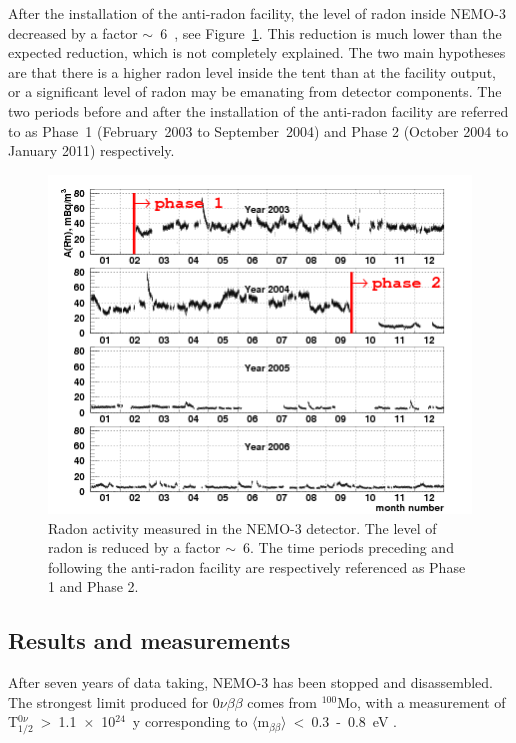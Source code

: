 \documentclass[main.tex]{subfiles}
\begin{document}
\NI After the installation of the anti-radon facility, the level of radon inside NEMO-3 decreased by a factor $\sim$~6~\cite{NEMO3-BKG}, see Figure~\ref{RadonByTime}. This reduction is much lower than the expected reduction, which is not completely explained. The two main hypotheses are that there is a higher radon level inside the tent than at the facility output, or a significant level of radon may be emanating from detector components. The two periods before and after the installation of the anti-radon facility are referred to as Phase~1 (February~2003 to September~2004) and Phase 2 (October 2004 to January 2011) respectively.

 
\begin{figure}[h!]
\begin{center}
\includegraphics[scale=0.75]{pictures/Chap3/rn_bytime.png}
\caption{Radon activity measured in the NEMO-3 detector. The level of radon is reduced by a factor $\sim$~6. The time periods preceding and following the anti-radon facility are respectively referenced as Phase 1 and Phase 2.}
\label{RadonByTime}
\end{center}
\end{figure}


\FloatBarrier


\FloatBarrier

\subsection{Results and measurements}


\NI After seven years of data taking, NEMO-3 has been stopped and disassembled. The strongest limit produced for 0$\nu\beta\beta$ comes from $^{\text{100}}$Mo, with a measurement of T$_{\text{1/2}}^{\text{0}\nu}$~>~1.1~$\times$~10$^{\text{24}}$~y corresponding to $\langle$m$_{\beta\beta}\rangle$~<~0.3~-~0.8~eV \cite{NEMO3:Mo100}.
\end{document}

